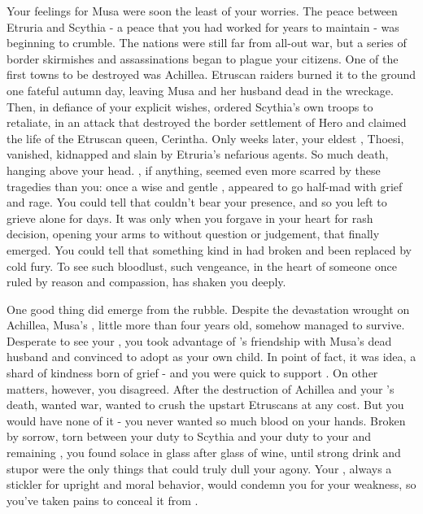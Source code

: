 \documentclass[char]{Kos}
\begin{document}
Your feelings for Musa were soon the least of your worries. The peace between Etruria and Scythia - a peace that you had worked for years to maintain - was beginning to crumble. The nations were still far from all-out war, but a series of border skirmishes and assassinations began to plague your citizens. One of the first towns to be destroyed was Achillea. Etruscan raiders burned it to the ground one fateful autumn day, leaving Musa and her husband dead in the wreckage. Then, in defiance of your explicit wishes, \cScythiaQueen{\Monarch} \cScythiaQueen{} ordered Scythia's own troops to retaliate, in an attack that destroyed the border settlement of Hero and claimed the life of the Etruscan queen, Cerintha. Only weeks later, your eldest \cFugitive{\offspring}, Thoesi, vanished, kidnapped and slain by Etruria's nefarious agents. So much death, hanging above your head. \cScythiaQueen{}, if anything, seemed even more scarred by these tragedies than you: once a wise and gentle \cScythiaQueen{\human}, \cScythiaQueen{\they} appeared to go half-mad with grief and rage. You could tell that \cScythiaQueen{\they} couldn't bear your presence, and so you left \cScythiaQueen{\them} to grieve alone for days. It was only when you forgave \cScythiaQueen{\them} in your heart for \cScythiaQueen{\their} rash decision, opening your arms to \cScythiaQueen{\them} without question or judgement, that \cScythiaQueen{\they} finally emerged. You could tell that something kind in \cScythiaQueen{\them} had broken and been replaced by cold fury. To see such bloodlust, such vengeance, in the heart of someone once ruled by reason and compassion, has shaken you deeply.

One good thing did emerge from the rubble. Despite the devastation wrought on Achillea, Musa's \cWard{\offspring} \cWard{}, little more than four years old, somehow managed to survive. Desperate to see your \cWard{\offspring}, you took advantage of \cScythiaQueen{}'s friendship with Musa's dead husband and convinced \cScythiaQueen{\them} to adopt \cWard{} as your own child. In point of fact, it was \cScythiaQueen{\their} idea, a shard of kindness born of grief - and you were quick to support \cScythiaQueen{\them}. On other matters, however, you disagreed. After the destruction of Achillea and your \cFugitive{\offspring}'s death, \cScythiaQueen{} wanted war, wanted to crush the upstart Etruscans at any cost. But you would have none of it - you never wanted so much blood on your hands. Broken by sorrow, torn between your duty to Scythia and your duty to your \cScythiaQueen{\spouse} and remaining \cBride{\offspring}, you found solace in glass after glass of wine, until strong drink and stupor were the only things that could truly dull your agony. Your \cScythiaQueen{\spouse}, always a stickler for upright and moral behavior, would condemn you for your weakness, so you've taken pains to conceal it from \cScythiaQueen{\them}.
\end{document}
